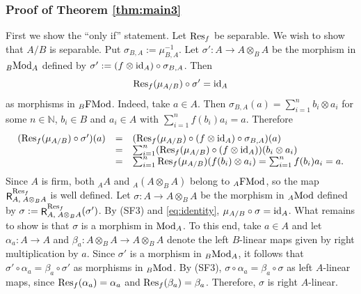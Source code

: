 \documentclass[12pt]{amsart}
\theoremstyle{definition}
\newcommand{\N}{\mathbb{N}}
\newcommand{\Mod}{{\rm Mod}}
\newcommand{\FMod}{{\rm FMod}}
\newcommand{\id}{{\rm id}}
\newcommand{\Res}{{\rm Res}}
\DeclareMathOperator{\R}{\mathsf R}
\begin{document}
\subsubsection*{Proof of 
Theorem \ref{thm:main3}}
First we show the ``only if'' statement. 
Let $\Res_f$ be separable.
We wish to show that $A/B$ is separable.
Put $\sigma_{B,A} := \mu_{B,A}^{-1}$.
Let $\sigma' : A \to A \otimes_B A$
be the morphism in ${}_B \Mod_A$ defined by
$\sigma' := 
(f \otimes \id_A) \circ \sigma_{B,A}$. 
Then 
\begin{equation}\label{eq:identity}
\Res_f(\mu_{A/B}) \circ \sigma'= \id_A
\end{equation}
as morphisms in ${}_B \FMod$. Indeed,
take $a \in A$. Then
$\sigma_{B,A}(a) = 
\sum_{i=1}^n b_i \otimes a_i$
for some $n \in \N$, $b_i \in B$ and $a_i \in A$ with 
$\sum_{i=1}^n f(b_i) a_i = a$. Therefore
\[
\begin{array}{rcl}
(\Res_f(\mu_{A/B}) \circ \sigma')(a) 
&=& 
(\Res_f(\mu_{A/B}) \circ  
(f \otimes \id_A) \circ \sigma_{B,A})(a)  \\
&=& 
\sum_{i=1}^n (\Res_f(\mu_{A/B}) \circ  
(f \otimes \id_A)) (b_i \otimes a_i) \\
&=&
\sum_{i=1}^n 
\Res_f(\mu_{A/B}) (f(b_i) \otimes a_i) 
= \sum_{i=1}^n f(b_i) a_i = a.
\end{array}
\]
Since $A$ is firm, both ${}_A A$ and ${}_A(A \otimes_B A)$ belong to ${}_A\FMod$, so the map
$\R^{\Res_f}_{A,\;A\otimes_B A}$ is well defined.
Let $\sigma : A \to A \otimes_B A$ be the morphism in 
${}_A\Mod$ defined by
$\sigma := \R^{\Res_f}_{A,\;A\otimes_B A}(\sigma')$.
By (SF3) and \eqref{eq:identity},
$\mu_{A/B} \circ \sigma = \id_A$.
What remains to show is that $\sigma$ 
is a morphism in $\Mod_A$. 
To this end, take $a \in A$ and 
let $\alpha_a : A \to A$ and
$\beta_a : A \otimes_B A \rightarrow A \otimes_B A$ denote 
the left $B$-linear maps given by right 
multiplication by $a$.
Since $\sigma'$ is a morphism in ${}_B \Mod_A$, 
it follows that $\sigma' \circ \alpha_a = \beta_a \circ \sigma'$ as morphisms in ${}_B \Mod$.
By (SF3), 
$\sigma \circ \alpha_a = \beta_a \circ \sigma$ as left $A$-linear maps,
since $\Res_f( \alpha_a ) = \alpha_a$ and 
$\Res_f( \beta_a ) = \beta_a$.
Therefore, $\sigma$ is right $A$-linear.
\end{document}
